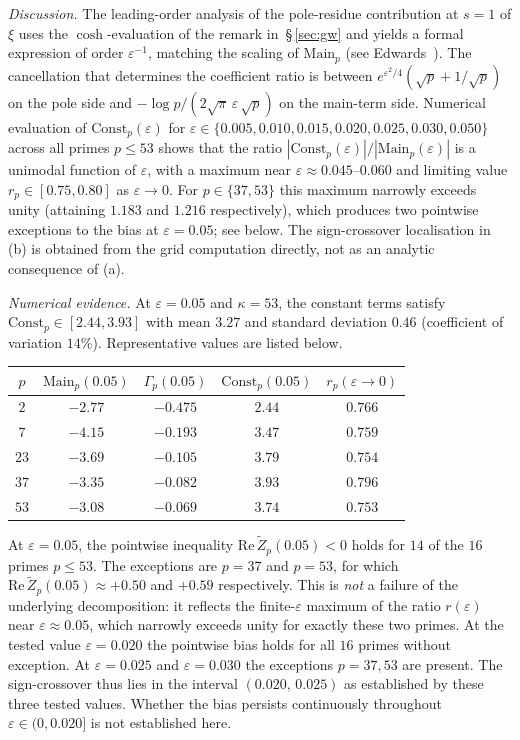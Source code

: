 \documentclass[11pt]{article}
\newcommand{\Zt}{\widetilde{Z}}
\begin{document}
\emph{Discussion.}
The leading-order analysis of the pole-residue contribution at $s=1$
of $\xi$ uses the $\cosh$-evaluation of the remark in~\S\,\ref{sec:gw}
and yields a formal expression of order $\varepsilon^{-1}$, matching
the scaling of $\mathrm{Main}_p$ (see
Edwards~\cite[\S1.16 and \S3.6]{Edwards}).
The cancellation that determines the coefficient ratio is between
$e^{\varepsilon^2/4}(\sqrt p + 1/\sqrt p)$ on the pole side and
$-\log p/(2\sqrt\pi\,\varepsilon\,\sqrt p)$ on the main-term side.
Numerical evaluation of $\mathrm{Const}_p(\varepsilon)$ for
$\varepsilon\in\{0.005,0.010,0.015,0.020,0.025,0.030,0.050\}$ across
all primes $p\le 53$ shows that the ratio
$|\mathrm{Const}_p(\varepsilon)|/|\mathrm{Main}_p(\varepsilon)|$ is a
unimodal function of $\varepsilon$, with a maximum near
$\varepsilon\approx 0.045$--$0.060$ and limiting value
$r_p\in[0.75,0.80]$ as $\varepsilon\to 0$.
For $p\in\{37,53\}$ this maximum narrowly exceeds unity (attaining
$1.183$ and $1.216$ respectively), which produces two pointwise
exceptions to the bias at $\varepsilon=0.05$; see below.
The sign-crossover localisation in (b) is obtained from the grid
computation directly, not as an analytic consequence of (a).

\emph{Numerical evidence.}
At $\varepsilon=0.05$ and $\kappa=53$, the constant terms satisfy
$\mathrm{Const}_p\in[2.44,3.93]$ with mean $3.27$ and standard
deviation $0.46$ (coefficient of variation $14\%$).
Representative values are listed below.

\begin{center}
\begin{tabular}{ccccc}
\toprule
$p$ & $\mathrm{Main}_p(0.05)$ & $\Gamma_p(0.05)$
    & $\mathrm{Const}_p(0.05)$ & $r_p(\varepsilon\to 0)$ \\
\midrule
$2$  & $-2.77$ & $-0.475$ & $2.44$ & $0.766$ \\
$7$  & $-4.15$ & $-0.193$ & $3.47$ & $0.759$ \\
$23$ & $-3.69$ & $-0.105$ & $3.79$ & $0.754$ \\
$37$ & $-3.35$ & $-0.082$ & $3.93$ & $0.796$ \\
$53$ & $-3.08$ & $-0.069$ & $3.74$ & $0.753$ \\
\bottomrule
\end{tabular}
\end{center}

At $\varepsilon=0.05$, the pointwise inequality
$\mathrm{Re}\,\Zt_p(0.05)<0$ holds for $14$ of the $16$ primes
$p\le 53$.
The exceptions are $p=37$ and $p=53$, for which
$\mathrm{Re}\,\Zt_p(0.05)\approx+0.50$ and $+0.59$ respectively.
This is \emph{not} a failure of the underlying decomposition: it
reflects the finite-$\varepsilon$ maximum of the ratio $r(\varepsilon)$
near $\varepsilon\approx 0.05$, which narrowly exceeds unity for
exactly these two primes.
At the tested value $\varepsilon=0.020$ the pointwise bias holds for
all $16$ primes without exception.
At $\varepsilon=0.025$ and $\varepsilon=0.030$ the exceptions
$p=37,53$ are present.
The sign-crossover thus lies in the interval $(0.020,\,0.025)$ as
established by these three tested values.
Whether the bias persists continuously throughout
$\varepsilon\in(0,0.020]$ is not established here.
\end{document}
